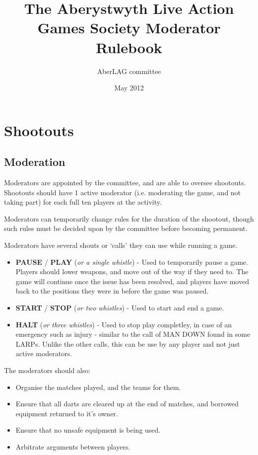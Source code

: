 \documentclass{article}
\begin{document}
\title{The Aberystwyth Live Action Games Society Moderator Rulebook}
\author{AberLAG committee}
\date{May 2012}
\maketitle{}

\tableofcontents
\newpage

\section{Shootouts}
		
	\subsection{Moderation}
	
		Moderators are appointed by the committee, and are able to oversee shootouts. Shootouts should have 1 active moderator (i.e. moderating the game, and not taking part) for each full ten players at the activity.
		
		Moderators can temporarily change rules for the duration of the shootout, though such rules must be decided upon by the committee before becoming permanent.

		Moderators have several shouts or `calls' they can use while running a game.
	
		\begin{itemize}
			\item \textbf{PAUSE} / \textbf{PLAY} ({\em or a single whistle}) - Used to temporarily pause a game. Players should lower weapons, and move out of the way if they need to. The game will continue once the issue has been resolved, and players have moved back to the positions they were in before the game was paused.
			
			\item \textbf{START} / \textbf{STOP} ({\em or two whistles}) - Used to start and end a game.
			
			\item \textbf{HALT} ({\em or three whistles}) - Used to stop play completley, in case of an emergency such as injury - similar to the call of MAN DOWN found in some LARPs. Unlike the other calls, this can be use by any player and not just active moderators.
		\end{itemize}
		
		\noindent The moderators should also:
			
		\begin{itemize}
			\item Organise the matches played, and the teams for them.
			\item Ensure that all darts are cleared up at the end of matches, and borrowed equipment returned to it's owner.
			\item Ensure that no unsafe equipment is being used.
			\item Arbitrate arguments between players.
		\end{itemize}
\end{document}
